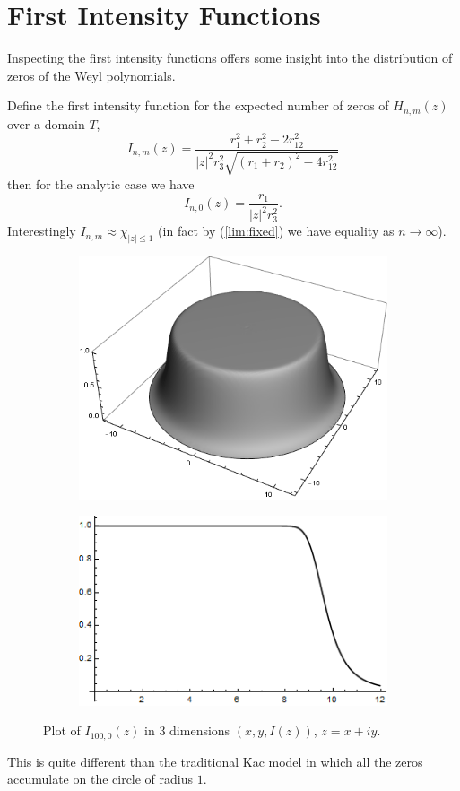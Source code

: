 \documentclass[12pt]{amsart}
\theoremstyle{remark}
\begin{document}
\section{First Intensity Functions}\label{sec1stInt}
Inspecting the first intensity functions offers some insight into the distribution of zeros of the Weyl polynomials.

Define the first intensity function for the expected number of zeros of $H_{n,m}(z)$ over a domain $T$,
\[I_{n,m}(z)=\frac{r_1^2+r_2^2-2r_{12}^2}{\lvert z\rvert^2r_3^2\sqrt{(r_1+r_2)^2-4r_{12}^2}}\]then for the analytic case we have
\[I_{n,0}(z)=\frac{r_1}{\lvert z\rvert^2r_3^2}.\]
Interestingly $I_{n,m} \approx \chi_{|z|\leq 1}$  (in fact by (\ref{lim:fixed}) we have equality as $n \rightarrow \infty$).
\begin{figure}[ht]
\begin{subfigure}[b]{.25\textwidth}
\includegraphics[width=\textwidth]{./img/HarmonicPolyPlotsAnalytic}
\end{subfigure}\quad
\begin{subfigure}[b]{.3\textwidth}
\includegraphics[width=\textwidth]{./img/HarmonicPolyPlotsAnalytic2D}
\end{subfigure}
\caption{Plot of $I_{100,0}(z)$ in 3 dimensions $(x,y,I(z))$, $z=x+iy$.}
\end{figure}
This is quite different than the traditional Kac model in which all the zeros accumulate on the circle of radius $1$.  
\end{document}
